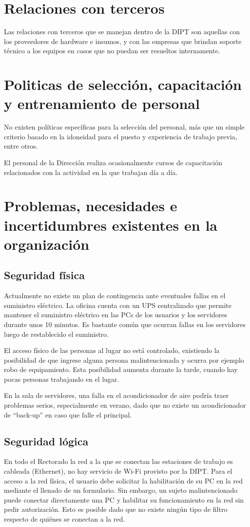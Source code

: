 \documentclass[a4paper,11pt,oneside]{article}
\begin{document}
\section{Relaciones con terceros}
Las relaciones con terceros que se manejan dentro de la DIPT son
aquellas con los proveedores de hardware e insumos, y con las empresas
que brindan soporte técnico a los equipos en casos que no puedan ser
resueltos internamente.
%
\section{Politicas de selección, capacitación y entrenamiento de personal}
%
No existen políticas específicas para la selección del personal, más
que un simple criterio basado en la idoneidad para el puesto y
experiencia de trabajo previa, entre otros.

El personal de la Dirección realiza ocasionalmente cursos de
capacitación relacionados con la actividad en la que trabajan día a
día.
%
\section{Problemas, necesidades e incertidumbres existentes en la organización}
%
\subsection*{Seguridad física}
Actualmente no existe un plan de contingencia ante eventuales fallas
en el suministro eléctrico. La oficina cuenta con un UPS centralizado
que permite mantener el suministro eléctrico en las PCs de los
usuarios y los servidores durante unos 10 minutos. Es bastante común
que ocurran fallas en los servidores luego de restablecido el
suministro.

El acceso físico de las personas al lugar no está controlado, existiendo la
posibilidad de que ingrese alguna persona malintencionada y ocurra por
ejemplo robo de equipamiento. Esta posibilidad aumenta durante la
tarde, cuando hay pocas personas trabajando en el lugar.

En la sala de servidores, una falla en el acondicionador de aire
podría traer problemas serios, especialmente en verano, dado que no
existe un acondicionador de ``back-up'' en caso que falle el
principal.
%
\subsection*{Seguridad lógica}
En todo el Rectorado la red a la que se conectan las estaciones de
trabajo es cableada (Ethernet), no hay servicio de Wi-Fi provisto por
la DIPT. Para el acceso a la red física, el usuario debe solicitar la
habilitación de su PC en la red mediante el llenado de un
formulario. Sin embargo, un sujeto malintencionado puede conectar
directamente una PC y habilitar su funcionamiento en la red sin pedir
autorización. Esto es posible dado que no existe ningún tipo de filtro
respecto de quiénes se conectan a la red.
\end{document}
